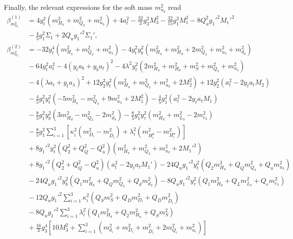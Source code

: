 \documentclass[preprint,amsmath,amssymb,aps,superscriptaddress,prd,showpacs,floatfix,nofootinbib]{revtex4-1}
\begin{document}
Finally, the relevant expressions for the soft mass $m_{u_3}^2$ read
\begin{subequations}
\begin{align}
\beta_{m_{u_3}^2}^{(1)}&=4y_t^2\left ( m_{H_u}^2+m_{Q_3}^2+m_{u_3}^2\right )+4a_t^2-\frac{32}{3}g_3^2M_3^2-\frac{32}{15}g_1^2M_1^2-8Q_u^2g_1'^2M_1'^2\nonumber\\
&{}-\frac{4}{5}g_1^2\Sigma_1+2Q_ug_1'^2\Sigma_1',\label{eq:USSMmu222BetaOneLoop}\\
\beta_{m_{u_3}^2}^{(2)}&=-32y_t^4\left ( m_{H_u}^2+m_{Q_3}^2+m_{u_3}^2\right )-4y_t^2y_b^2\left ( m_{H_u}^2+m_{H_d}^2+2m_{Q_3}^2+m_{u_3}^2+m_{d_3}^2\right )\nonumber\\
&{}-64y_t^2a_t^2-4\left ( y_ta_b+y_ba_t\right )^2-4\lambda^2y_t^2\left ( 2m_{H_u}^2+m_{H_d}^2+m_S^2+m_{Q_3}^2+m_{u_3}^2\right )\nonumber\\
&{}-4\left ( \lambda a_t + y_ta_\lambda \right )^2+12g_2^2y_t^2\left ( m_{H_u}^2+m_{Q_3}^2+m_{u_3}^2+2M_2^2\right )+12g_2^2\left ( a_t^2-2y_ta_tM_2\right )\nonumber\\
&{}-\frac{4}{5}g_1^2y_t^2\left ( -5m_{H_u}^2-m_{Q_3}^2+9m_{u_3}^2+2M_1^2\right )-\frac{4}{5}g_1^2\left ( a_t^2-2y_ta_tM_1 \right )\nonumber\\
&{}-\frac{8}{5}g_1^2y_b^2\left ( 3m_{H_d}^2-m_{Q_3}^2-2m_{d_3}^2\right )-\frac{8}{5}g_1^2y_\tau^2\left ( m_{H_d}^2+m_{L_3}^2-2m_{e_3}^2\right )\nonumber\\
&{}-\frac{8}{5}g_1^2\sum_{i=1}^3\left [ \kappa_i^2\left ( m_{D_i}^2-m_{\overline{D}_i}^2 \right )+\lambda_i^2\left ( m_{H_i^d}^2-m_{H_i^u}^2 \right )\right ]\nonumber\\
&{}+8g_1'^2y_t^2\left ( Q_2^2+Q_Q^2-Q_u^2\right )\left ( m_{H_u}^2+m_{Q_3}^2+m_{u_3}^2+2M_1'^2\right )\nonumber\\
&{}+8g_1'^2\left ( Q_2^2+Q_Q^2-Q_u^2\right )\left ( a_t^2-2y_ta_tM_1'\right )-24Q_ug_1'^2y_t^2\left (Q_2m_{H_u}^2+Q_Qm_{Q_3}^2+Q_um_{u_3}^2\right )\nonumber\\
&{}-24Q_ug_1'^2y_b^2\left ( Q_1m_{H_d}^2+Q_Qm_{Q_3}^2+Q_dm_{d_3}^2\right )-8Q_ug_1'^2y_\tau^2\left ( Q_1m_{H_d}^2+Q_Lm_{L_3}^2+Q_em_{e_3}^2\right )\nonumber\\
&{}-12Q_ug_1'^2\sum_{i=1}^3\kappa_i^2\left ( Q_Sm_S^2+Q_Dm_{D_i}^2+Q_{\overline{D}}m_{\overline{D}_i}^2\right )\nonumber\\
&{}-8Q_ug_1'^2\sum_{i=1}^3\lambda_i^2\left ( Q_1m_{H_d}^2+Q_2m_{H_u}^2+Q_Sm_S^2\right )\nonumber\\
&{}+\frac{16}{3}g_3^4\left [ 10M_3^2+\sum_{i=1}^3\left ( m_{d_i}^2+m_{D_i}^2+m_{\overline{D}_i}^2+2m_{Q_i}^2+m_{u_i}^2\right )\right ]\nonumber\\

\end{align}
\end{subequations}
\end{document}
